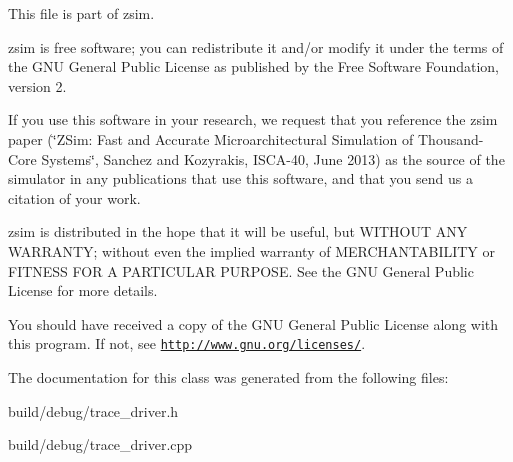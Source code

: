 This file is part of zsim.

zsim is free software; you can redistribute it and/or modify it under the terms of the G\-N\-U General Public License as published by the Free Software Foundation, version 2.

If you use this software in your research, we request that you reference the zsim paper (\char`\"{}\-Z\-Sim\-: Fast and Accurate Microarchitectural Simulation of
\-Thousand-\/\-Core Systems\char`\"{}, Sanchez and Kozyrakis, I\-S\-C\-A-\/40, June 2013) as the source of the simulator in any publications that use this software, and that you send us a citation of your work.

zsim is distributed in the hope that it will be useful, but W\-I\-T\-H\-O\-U\-T A\-N\-Y W\-A\-R\-R\-A\-N\-T\-Y; without even the implied warranty of M\-E\-R\-C\-H\-A\-N\-T\-A\-B\-I\-L\-I\-T\-Y or F\-I\-T\-N\-E\-S\-S F\-O\-R A P\-A\-R\-T\-I\-C\-U\-L\-A\-R P\-U\-R\-P\-O\-S\-E. See the G\-N\-U General Public License for more details.

You should have received a copy of the G\-N\-U General Public License along with this program. If not, see \href{http://www.gnu.org/licenses/}{\tt http\-://www.\-gnu.\-org/licenses/}. 

The documentation for this class was generated from the following files\-:\begin{DoxyCompactItemize}
\item 
build/debug/trace\-\_\-driver.\-h\item 
build/debug/trace\-\_\-driver.\-cpp\end{DoxyCompactItemize}
